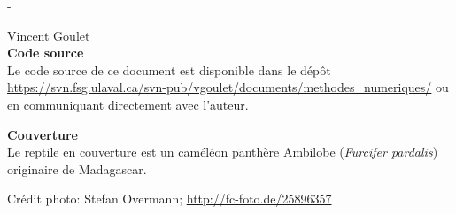 \begingroup
\calccentering{\unitlength}
\begin{adjustwidth*}{\unitlength}{-\unitlength}
  \setlength{\parindent}{0pt}
  \setlength{\parskip}{\baselineskip}

  {\textcopyright} {\year} Vincent Goulet \\

  

  \sloppy
  \textbf{Code source} \\
  Le code source de ce document est disponible dans le dépôt
    \url{https://svn.fsg.ulaval.ca/svn-pub/vgoulet/documents/methodes_numeriques/}
  ou en communiquant directement avec l'auteur.

  \fussy
  \textbf{Couverture} \\
  Le reptile en couverture est un caméléon panthère Ambilobe
  (\emph{Furcifer pardalis}) originaire de Madagascar.

  Crédit photo: Stefan Overmann; \url{http://fc-foto.de/25896357}
\end{adjustwidth*}
\endgroup


